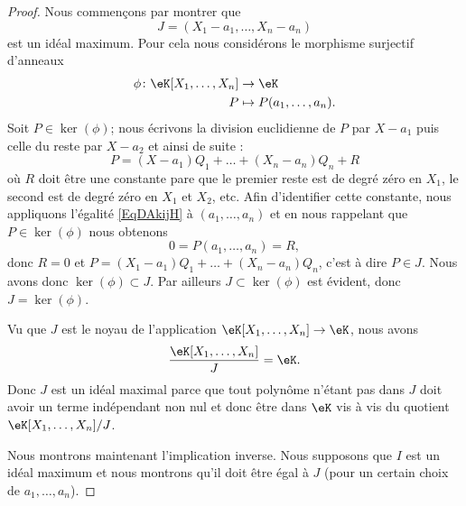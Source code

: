 \begin{proof}
    Nous commençons par montrer que
    \begin{equation}
        J=(X_1-a_1,\ldots, X_n-a_n)
    \end{equation}
    est un idéal maximum. Pour cela nous considérons le morphisme surjectif d'anneaux
    \begin{equation}
        \begin{aligned}
            \phi\colon \eK[X_1,\ldots, X_n]&\to \eK \\
            P&\mapsto P(a_1,\ldots, a_n). 
        \end{aligned}
    \end{equation}
    Soit \( P\in\ker(\phi)\); nous écrivons la division euclidienne de \( P\) par \( X-a_1\) puis celle du reste par \( X-a_2\) et ainsi de suite :
    \begin{equation}    \label{EqDAkijH}
        P=(X-a_1)Q_1+\ldots +(X_n-a_n)Q_n+R
    \end{equation}
    où \( R\) doit être une constante pare que le premier reste est de degré zéro en \( X_1\), le second est de degré zéro en \( X_1\) et \( X_2\), etc. Afin d'identifier cette constante, nous appliquons l'égalité \eqref{EqDAkijH} à \( (a_1,\ldots, a_n)\) et en nous rappelant que \( P\in \ker(\phi)\) nous obtenons
    \begin{equation}
        0=P(a_1,\ldots, a_n)=R,
    \end{equation}
    donc \( R=0\) et \( P=(X_1-a_1)Q_1+\ldots +(X_n-a_n)Q_n\), c'est à dire \( P\in J\). Nous avons donc \( \ker(\phi)\subset J\). Par ailleurs \( J\subset \ker(\phi)\) est évident, donc \( J=\ker(\phi)\).

    Vu que \( J\) est le noyau de l'application \( \eK[X_1,\ldots, X_n]\to \eK\), nous avons 
    \begin{equation}
        \frac{ \eK[X_1,\ldots, X_n] }{ J }=\eK.
    \end{equation}
    Donc \( J\) est un idéal maximal parce que tout polynôme n'étant pas dans \( J\) doit avoir un terme indépendant non nul et donc être dans \( \eK\) vis à vis du quotient \( \eK[X_1,\ldots, X_n]/J\).

    Nous montrons maintenant l'implication inverse. Nous supposons que \( I\) est un idéal maximum et nous montrons qu'il doit être égal à \( J\) (pour un certain choix de \( a_1,\ldots, a_n\)).


\end{proof}
